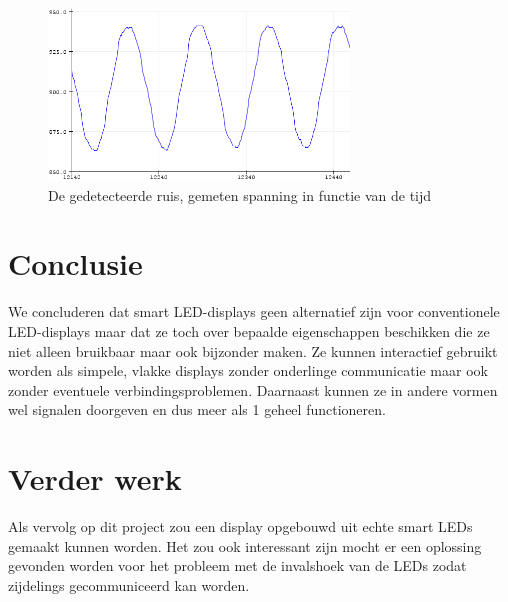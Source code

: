 \documentclass{article}
\begin{document}
\begin{figure}
\centering
\includegraphics[width=8cm]{ruis.png}
\caption{De gedetecteerde ruis, gemeten spanning in functie van de tijd}
\label{fig:ruis}
\end{figure}



\section{Conclusie}
We concluderen dat smart LED-displays geen alternatief zijn voor conventionele LED-displays maar dat ze toch over bepaalde eigenschappen beschikken die ze niet alleen bruikbaar maar ook bijzonder maken. Ze kunnen interactief gebruikt worden als simpele, vlakke displays zonder onderlinge communicatie maar ook zonder eventuele verbindingsproblemen. Daarnaast kunnen ze in andere vormen wel signalen doorgeven en dus meer als 1 geheel functioneren.


\section{Verder werk}
Als vervolg op dit project zou een display opgebouwd uit echte smart LEDs gemaakt kunnen worden. Het zou ook interessant zijn mocht er een oplossing gevonden worden voor het probleem met de invalshoek van de LEDs zodat zijdelings gecommuniceerd kan worden.




\end{document}
